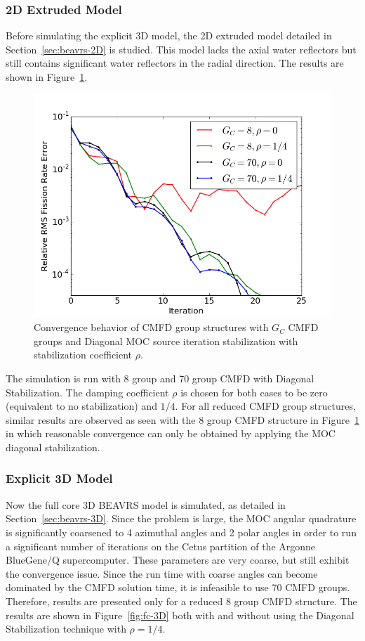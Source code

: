 \subsubsection{2D Extruded Model}

Before simulating the explicit 3D model, the 2D extruded model detailed in Section~\ref{sec:beavrs-2D} is studied. This model lacks the axial water reflectors but still contains significant water reflectors in the radial direction. The results are shown in Figure~\ref{fig:fc-2D}. 
\begin{figure}[ht!]
	\centering
	\includegraphics[width=0.65\linewidth]{figures/convergence/fc_2D.png}
	\caption{Convergence behavior of \ac{CMFD} group structures with $G_C$ \ac{CMFD} groups and Diagonal \ac{MOC} source iteration stabilization with stabilization coefficient $\rho$.}
	\label{fig:fc-2D}
\end{figure}
The simulation is run with 8 group and 70 group \ac{CMFD} with Diagonal Stabilization. The damping coefficient $\rho$ is chosen for both cases to be zero (equivalent to no stabilization) and $1/4$. For all reduced \ac{CMFD} group structures, similar results are observed as seen with the 8 group \ac{CMFD} structure in Figure~\ref{fig:fc-2D} in which reasonable convergence can only be obtained by applying the \ac{MOC} diagonal stabilization.

\subsubsection{Explicit 3D Model}

Now the full core 3D BEAVRS model is simulated, as detailed in Section~\ref{sec:beavrs-3D}. Since the problem is large, the \ac{MOC} angular quadrature is significantly coarsened to 4 azimuthal angles and 2 polar angles in order to run a significant number of iterations on the Cetus partition of the Argonne BlueGene/Q supercomputer. These parameters are very coarse, but still exhibit the convergence issue. Since the run time with coarse angles can become dominated by the \ac{CMFD} solution time, it is infeasible to use 70 \ac{CMFD} groups. Therefore, results are presented only for a reduced 8 group \ac{CMFD} structure. The results are shown in Figure~\ref{fig:fc-3D} both with and without using the Diagonal Stabilization technique with $\rho = 1/4$. 

